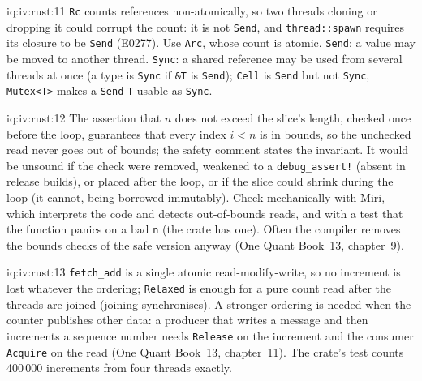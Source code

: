 \begin{solution}{iq:iv:rust:11}
\texttt{Rc} counts references non-atomically, so two threads cloning or dropping it could corrupt the count: it is not
\texttt{Send}, and \texttt{thread::spawn} requires its closure to be \texttt{Send} (E0277). Use \texttt{Arc}, whose count is atomic.
\texttt{Send}: a value may be moved to another thread. \texttt{Sync}: a shared reference may be used from several threads at once (a
type is \texttt{Sync} if \texttt{\&T} is \texttt{Send}); \texttt{Cell} is \texttt{Send} but not \texttt{Sync}, \texttt{Mutex<T>} makes a
\texttt{Send} \texttt{T} usable as \texttt{Sync}.
\end{solution}

\begin{solution}{iq:iv:rust:12}
The assertion that $n$ does not exceed the slice's length, checked once before the loop, guarantees that every index
$i < n$ is in bounds, so the unchecked read never goes out of bounds; the safety comment states the invariant. It would be unsound if the check were removed, weakened to a
\texttt{debug\_assert!} (absent in release builds), or placed after the loop, or if the slice could shrink during the loop (it
cannot, being borrowed immutably). Check mechanically with Miri, which interprets the code and detects out-of-bounds reads, and
with a test that the function panics on a bad \texttt{n} (the crate has one). Often the compiler removes the bounds checks of the
safe version anyway (One Quant Book~13, chapter~9).
\end{solution}

\begin{solution}{iq:iv:rust:13}
\label{lst:iv:rust:count}
\texttt{fetch\_add} is a single atomic read-modify-write, so no increment is lost whatever the ordering; \texttt{Relaxed} is enough for
a pure count read after the threads are joined (joining synchronises). A stronger ordering is needed when the counter publishes
other data: a producer that writes a message and then increments a sequence number needs \texttt{Release} on the increment and
the consumer \texttt{Acquire} on the read (One Quant Book~13, chapter~11). The crate's test counts 400\,000 increments from four
threads exactly.
\end{solution}
